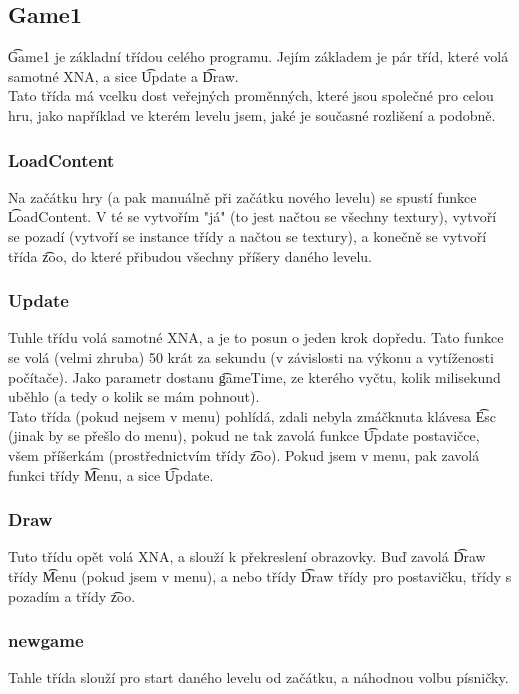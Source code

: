\subsection{Game1}
\t{Game1} je základní třídou celého programu. Jejím základem je pár tříd, které volá samotné XNA, a sice \t{Update} a \t{Draw}.\\
Tato třída má vcelku dost veřejných proměnných, které jsou společné pro celou hru, jako například ve kterém levelu jsem, jaké je současné rozlišení a podobně.\\
\subsubsection{LoadContent}
Na začátku hry (a pak manuálně při začátku nového levelu) se spustí funkce \t{LoadContent}. V té se vytvořím "já" (to jest načtou se všechny textury), vytvoří se pozadí (vytvoří se instance třídy a načtou se textury), a konečně se vytvoří třída \t{zoo}, do které přibudou všechny příšery daného levelu.
\subsubsection{Update}
Tuhle třídu volá samotné XNA, a je to posun o jeden krok dopředu. Tato funkce se volá (velmi zhruba) 50 krát za sekundu (v závislosti na výkonu a vytíženosti počítače). Jako parametr dostanu \t{gameTime}, ze kterého vyčtu, kolik milisekund uběhlo (a tedy o kolik se mám pohnout).\\
Tato třída (pokud nejsem v menu) pohlídá, zdali nebyla zmáčknuta klávesa \t{Esc} (jinak by se přešlo do menu), pokud ne tak zavolá funkce \t{Update} postavičce, všem příšerkám (prostřednictvím třídy \t{zoo}). Pokud jsem v menu, pak zavolá funkci třídy \t{Menu}, a sice \t{Update}.
\subsubsection{Draw}
Tuto třídu opět volá XNA, a slouží k překreslení obrazovky. Buď zavolá \t{Draw} třídy \t{Menu} (pokud jsem v menu), a nebo třídy \t{Draw} třídy pro postavičku, třídy s pozadím a třídy \t{zoo}. 
\subsubsection{newgame}
Tahle třída slouží pro start daného levelu od začátku, a náhodnou volbu písničky.
